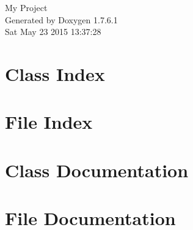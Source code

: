 \documentclass[a4paper]{book}
\begin{document}
\hypersetup{pageanchor=false,citecolor=blue}
\begin{titlepage}
\vspace*{7cm}
\begin{center}
{\Large \-My \-Project }\\
\vspace*{1cm}
{\large \-Generated by Doxygen 1.7.6.1}\\
\vspace*{0.5cm}
{\small Sat May 23 2015 13:37:28}\\
\end{center}
\end{titlepage}
\clearemptydoublepage
{}
\tableofcontents
\clearemptydoublepage
{}
\hypersetup{pageanchor=true,citecolor=blue}
\chapter{\-Class \-Index}

\chapter{\-File \-Index}

\chapter{\-Class \-Documentation}












\chapter{\-File \-Documentation}













\printindex
\end{document}
